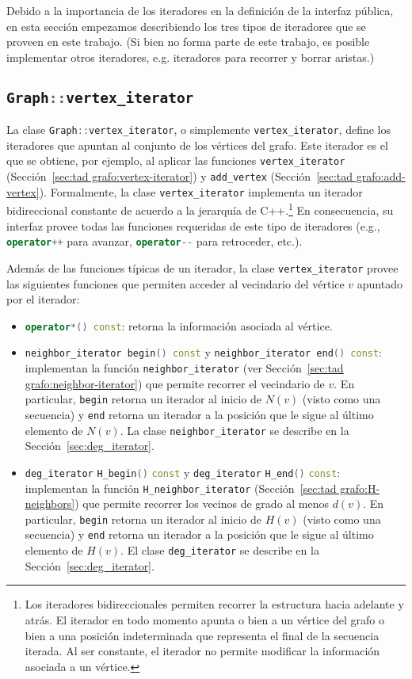 \documentclass[%
    a4paper,%
    fontsize=12pt,%
    DIV=12,
    twoside,%
    openright,%
    titlepage=true,%
    headsepline,%
    toc=bibliography,%
    parskip=half,%
    cleardoublepage=empty,%
    headings=big,%
]{scrbook}
\makeatletter
\newcommand{\Code}[1]{\lstinline[basicstyle={\ttfamily}]@#1@}
\newcommand{\CPPCode}[1]{\lstinline[language=C++,basicstyle={\ttfamily}]@#1@}
\DeclareRobustCommand{\CPP}{C\nolinebreak[4]\hspace{-.05em}\raisebox{.4ex}{\relsize{-3}\textbf{++}}\xspace}
\def\CPP{C++}%
\makeatother
\begin{document}
Debido a la importancia de los iteradores en la definición de la interfaz pública, en esta sección empezamos describiendo los tres tipos de iteradores que se proveen en este trabajo.  (Si bien no forma parte de este trabajo, es posible implementar otros iteradores, e.g. iteradores para recorrer y borrar aristas.)

\def\lstlistingname{Código}
\subsection{\texorpdfstring{\protect\CPPCode{Graph::vertex_iterator}}{Graph::vertex\_iterator}}
\label{sec:vertex iterator}

La clase \CPPCode{Graph::vertex_iterator}, o simplemente \CPPCode{vertex_iterator}, define los iteradores que apuntan al conjunto de los vértices del grafo.  Este iterador es el que se obtiene, por ejemplo, al aplicar las funciones \Code{vertex_iterator} (Sección~\ref{sec:tad grafo:vertex-iterator}) y \Code{add_vertex} (Sección~\ref{sec:tad grafo:add-vertex}).  Formalmente, la clase \CPPCode{vertex_iterator} implementa un iterador bidireccional constante de acuerdo a la jerarquía de \CPP.\footnote{Los iteradores bidireccionales permiten recorrer la estructura hacia adelante y atrás.  El iterador en todo momento apunta o bien a un vértice del grafo o bien a una posición indeterminada que representa el final de la secuencia iterada.  Al ser constante, el iterador no permite modificar la información asociada a un vértice.}  En consecuencia, su interfaz provee todas las funciones requeridas de este tipo de iteradores (e.g., \CPPCode{operator++} para avanzar, \CPPCode{operator--} para retroceder, etc.).  

Además de las funciones típicas de un iterador, la clase \CPPCode{vertex_iterator} provee las siguientes funciones que permiten acceder al vecindario del vértice $v$ apuntado por el iterador:
\begin{itemize}
 \item \CPPCode{operator*() const}: retorna la información asociada al vértice.
 \item \CPPCode{neighbor_iterator begin() const} y \CPPCode{neighbor_iterator end() const}: implementan la función \Code{neighbor_iterator} (ver Sección~\ref{sec:tad grafo:neighbor-iterator}) que permite recorrer el vecindario de $v$.  En particular, \CPPCode{begin} retorna un iterador al inicio de $N(v)$ (visto como una secuencia) y \CPPCode{end} retorna un iterador a la posición que le sigue al último elemento de $N(v)$.  La clase \CPPCode{neighbor_iterator} se describe en la Sección~\ref{sec:deg_iterator}. 
 \item \CPPCode{deg_iterator} \CPPCode{H_begin()} \CPPCode{const} y \CPPCode{deg_iterator} \CPPCode{H_end()} \CPPCode{const}: implementan la función \Code{H_neighbor_iterator} (Sección~\ref{sec:tad grafo:H-neighbors}) que permite recorrer los vecinos de grado al menos $d(v)$.  En particular, \CPPCode{begin} retorna un iterador al inicio de $H(v)$ (visto como una secuencia) y \CPPCode{end} retorna un iterador a la posición que le sigue al último elemento de $H(v)$.  El clase \CPPCode{deg_iterator} se describe en la Sección~\ref{sec:deg_iterator}. 
\end{itemize}
\end{document}
